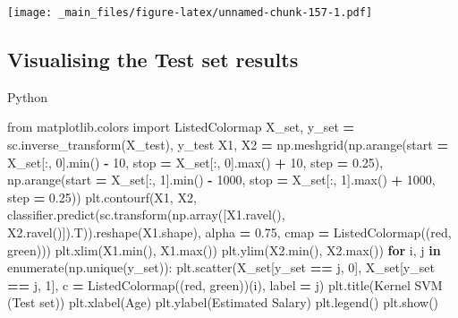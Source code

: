 \documentclass[
]{book}
\newenvironment{Shaded}{\begin{snugshade}}{\end{snugshade}}
\newcommand{\BuiltInTok}[1]{#1}
\newcommand{\ControlFlowTok}[1]{\textcolor[rgb]{0.13,0.29,0.53}{\textbf{#1}}}
\newcommand{\DecValTok}[1]{\textcolor[rgb]{0.00,0.00,0.81}{#1}}
\newcommand{\FloatTok}[1]{\textcolor[rgb]{0.00,0.00,0.81}{#1}}
\newcommand{\ImportTok}[1]{#1}
\newcommand{\KeywordTok}[1]{\textcolor[rgb]{0.13,0.29,0.53}{\textbf{#1}}}
\newcommand{\NormalTok}[1]{#1}
\newcommand{\OperatorTok}[1]{\textcolor[rgb]{0.81,0.36,0.00}{\textbf{#1}}}
\newcommand{\StringTok}[1]{\textcolor[rgb]{0.31,0.60,0.02}{#1}}
\theoremstyle{definition}
\theoremstyle{definition}
\theoremstyle{definition}
\theoremstyle{definition}
\theoremstyle{remark}
\begin{document}
\texttt{[image: \_main\_files/figure-latex/unnamed-chunk-157-1.pdf]}

\hypertarget{visualising-the-test-set-results-4}{%
\subsection{Visualising the Test set results}\label{visualising-the-test-set-results-4}}

Python

\begin{Shaded}
\begin{Highlighting}[]
\ImportTok{from}\NormalTok{ matplotlib.colors }\ImportTok{import}\NormalTok{ ListedColormap}
\NormalTok{X\_set, y\_set }\OperatorTok{=}\NormalTok{ sc.inverse\_transform(X\_test), y\_test}
\NormalTok{X1, X2 }\OperatorTok{=}\NormalTok{ np.meshgrid(np.arange(start }\OperatorTok{=}\NormalTok{ X\_set[:, }\DecValTok{0}\NormalTok{].}\BuiltInTok{min}\NormalTok{() }\OperatorTok{{-}} \DecValTok{10}\NormalTok{, stop }\OperatorTok{=}\NormalTok{ X\_set[:, }\DecValTok{0}\NormalTok{].}\BuiltInTok{max}\NormalTok{() }\OperatorTok{+} \DecValTok{10}\NormalTok{, step }\OperatorTok{=} \FloatTok{0.25}\NormalTok{),}
\NormalTok{                     np.arange(start }\OperatorTok{=}\NormalTok{ X\_set[:, }\DecValTok{1}\NormalTok{].}\BuiltInTok{min}\NormalTok{() }\OperatorTok{{-}} \DecValTok{1000}\NormalTok{, stop }\OperatorTok{=}\NormalTok{ X\_set[:, }\DecValTok{1}\NormalTok{].}\BuiltInTok{max}\NormalTok{() }\OperatorTok{+} \DecValTok{1000}\NormalTok{, step }\OperatorTok{=} \FloatTok{0.25}\NormalTok{))}
\NormalTok{plt.contourf(X1, X2, classifier.predict(sc.transform(np.array([X1.ravel(), X2.ravel()]).T)).reshape(X1.shape),}
\NormalTok{             alpha }\OperatorTok{=} \FloatTok{0.75}\NormalTok{, cmap }\OperatorTok{=}\NormalTok{ ListedColormap((}\StringTok{\textquotesingle{}red\textquotesingle{}}\NormalTok{, }\StringTok{\textquotesingle{}green\textquotesingle{}}\NormalTok{)))}
\NormalTok{plt.xlim(X1.}\BuiltInTok{min}\NormalTok{(), X1.}\BuiltInTok{max}\NormalTok{())}
\NormalTok{plt.ylim(X2.}\BuiltInTok{min}\NormalTok{(), X2.}\BuiltInTok{max}\NormalTok{())}
\ControlFlowTok{for}\NormalTok{ i, j }\KeywordTok{in} \BuiltInTok{enumerate}\NormalTok{(np.unique(y\_set)):}
\NormalTok{    plt.scatter(X\_set[y\_set }\OperatorTok{==}\NormalTok{ j, }\DecValTok{0}\NormalTok{], X\_set[y\_set }\OperatorTok{==}\NormalTok{ j, }\DecValTok{1}\NormalTok{], c }\OperatorTok{=}\NormalTok{ ListedColormap((}\StringTok{\textquotesingle{}red\textquotesingle{}}\NormalTok{, }\StringTok{\textquotesingle{}green\textquotesingle{}}\NormalTok{))(i), label }\OperatorTok{=}\NormalTok{ j)}
\NormalTok{plt.title(}\StringTok{\textquotesingle{}Kernel SVM (Test set)\textquotesingle{}}\NormalTok{)}
\NormalTok{plt.xlabel(}\StringTok{\textquotesingle{}Age\textquotesingle{}}\NormalTok{)}
\NormalTok{plt.ylabel(}\StringTok{\textquotesingle{}Estimated Salary\textquotesingle{}}\NormalTok{)}
\NormalTok{plt.legend()}
\NormalTok{plt.show()}
\end{Highlighting}
\end{Shaded}
\end{document}
